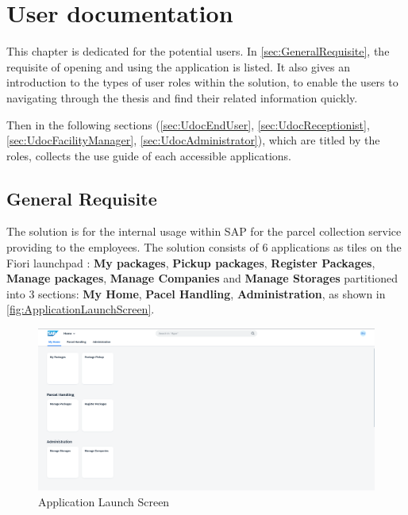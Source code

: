 \chapter{User documentation}
\label{ch:user}

This chapter is dedicated for the potential users. In \autoref{sec:GeneralRequisite}, the requisite of opening and using the application is listed. It also gives an introduction to the types of user roles within the solution, to enable the users to navigating through the thesis and find their related information quickly.

Then in the following sections (\autoref{sec:UdocEndUser}, \autoref{sec:UdocReceptionist}, \autoref{sec:UdocFacilityManager}, \autoref{sec:UdocAdministrator}), which are titled by the roles, collects the use guide of each accessible applications.

\section{General Requisite}
\label{sec:GeneralRequisite}

The solution is for the internal usage within SAP for the parcel collection service providing to the employees. The solution consists of 6 applications as tiles on the Fiori launchpad \cite{flp}: \textbf{My packages}, \textbf{Pickup packages}, \textbf{Register Packages}, \textbf{Manage packages}, \textbf{Manage Companies} and \textbf{Manage Storages} partitioned into 3 sections: \textbf{My Home}, \textbf{Pacel Handling}, \textbf{Administration}, as shown in \autoref{fig:ApplicationLaunchScreen}.

\begin{figure}[H]
	\centering
	\includegraphics[width=1\linewidth]{images/user_doc/overviews/sandbox.png}
	\caption{Application Launch Screen}
	\label{fig:ApplicationLaunchScreen}
\end{figure}


